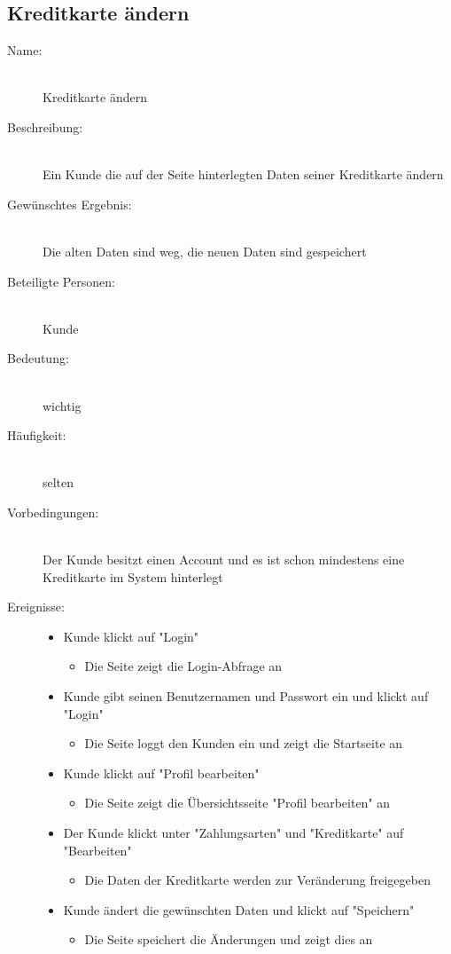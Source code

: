 \documentclass[a4paper]{article}
\begin{document}
\subsection{Kreditkarte ändern}
\begin{description}
	\item[Name:]\hfill \\
	Kreditkarte ändern
	\item[Beschreibung:]\hfill \\ 
	Ein Kunde die auf der Seite hinterlegten Daten seiner Kreditkarte ändern
	\item[Gewünschtes Ergebnis:]\hfill \\ 
	Die alten Daten sind weg, die neuen Daten sind gespeichert
	\item[Beteiligte Personen:]\hfill \\ 
	Kunde
	\item[Bedeutung:]\hfill \\ 
	wichtig
	\item[Häufigkeit:]\hfill \\ 
	selten
	\item[Vorbedingungen:]\hfill \\ 
	Der Kunde besitzt einen Account und es ist schon mindestens eine Kreditkarte im System hinterlegt
	\item[Ereignisse:]\hfill
	\begin{itemize}
		\item Kunde klickt auf "Login"
		\begin{itemize}
			\item Die Seite zeigt die Login-Abfrage an
		\end{itemize}
		\item Kunde gibt seinen Benutzernamen und Passwort ein und klickt auf "Login"
		\begin{itemize}
			\item Die Seite loggt den Kunden ein und zeigt die Startseite an
		\end{itemize}
		\item Kunde klickt auf "Profil bearbeiten"
		\begin{itemize}
			\item Die Seite zeigt die Übersichtsseite "Profil bearbeiten" an
		\end{itemize}
		\item Der Kunde klickt unter "Zahlungsarten" und "Kreditkarte" auf \\"Bearbeiten"
		\begin{itemize}
			\item Die Daten der Kreditkarte werden zur Veränderung freigegeben
		\end{itemize}
		\item Kunde ändert die gewünschten Daten und klickt auf "Speichern"
		\begin{itemize}
			\item Die Seite speichert die Änderungen und zeigt dies an
		\end{itemize}
	\end{itemize}
\end{description}
\end{document}
